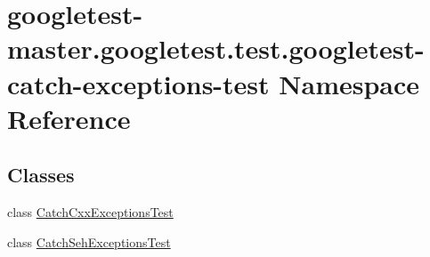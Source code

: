 \hypertarget{namespacegoogletest-master_1_1googletest_1_1test_1_1googletest-catch-exceptions-test}{}\section{googletest-\/master.googletest.\+test.\+googletest-\/catch-\/exceptions-\/test Namespace Reference}
\label{namespacegoogletest-master_1_1googletest_1_1test_1_1googletest-catch-exceptions-test}
\subsection*{Classes}
\begin{DoxyCompactItemize}
\item 
class \mbox{\hyperlink{classgoogletest-master_1_1googletest_1_1test_1_1googletest-catch-exceptions-test_1_1_catch_cxx_exceptions_test}{Catch\+Cxx\+Exceptions\+Test}}
\item 
class \mbox{\hyperlink{classgoogletest-master_1_1googletest_1_1test_1_1googletest-catch-exceptions-test_1_1_catch_seh_exceptions_test}{Catch\+Seh\+Exceptions\+Test}}
\end{DoxyCompactItemize}

